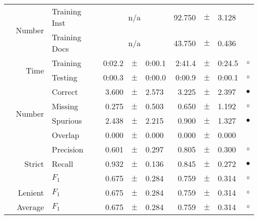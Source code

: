 \begin{longtable}{|r|r|l||rcl|rcl|c|}
\cline{2-10} & \multirow{2}{*}{    Number} &   Training Inst &    \multicolumn{3}{c|}{n/a}         &      92.750 &  $\pm$  &       3.128 &  \\
\cline{3-10} &                             &   Training Docs &    \multicolumn{3}{c|}{n/a}         &      43.750 &  $\pm$  &       0.436 &  \\
\cline{2-10} & \multirow{2}{*}{      Time} &        Training &      0:02.2 &  $\pm$  &      0:00.1 &      2:41.4 &  $\pm$  &      0:24.5 & $\circ$ \\
\cline{3-10} &                             &         Testing &      0:00.3 &  $\pm$  &      0:00.0 &      0:00.9 &  $\pm$  &      0:00.1 & $\circ$ \\
\hline
\pagebreak[4]
\hline
\hline
\multirow{11}{*}{\begin{sideways}amateur unit\end{sideways} }
             & \multirow{4}{*}{    Number} &         Correct &       3.600 &  $\pm$  &       2.573 &       3.225 &  $\pm$  &       2.397 & $\bullet$ \\
\cline{3-10} &                             &         Missing &       0.275 &  $\pm$  &       0.503 &       0.650 &  $\pm$  &       1.192 & $\circ$ \\
\cline{3-10} &                             &        Spurious &       2.438 &  $\pm$  &       2.215 &       0.900 &  $\pm$  &       1.327 & $\bullet$ \\
\cline{3-10} &                             &         Overlap &       0.000 &  $\pm$  &       0.000 &       0.000 &  $\pm$  &       0.000 &  \\
\cline{2-10} & \multirow{3}{*}{    Strict} &       Precision &       0.601 &  $\pm$  &       0.297 &       0.805 &  $\pm$  &       0.300 & $\circ$ \\
\cline{3-10} &                             &          Recall &       0.932 &  $\pm$  &       0.136 &       0.845 &  $\pm$  &       0.272 & $\bullet$ \\
\cline{3-10} &                             &           $F_1$ &       0.675 &  $\pm$  &       0.284 &       0.759 &  $\pm$  &       0.314 & $\circ$ \\
\cline{2-10} &                     Lenient &           $F_1$ &       0.675 &  $\pm$  &       0.284 &       0.759 &  $\pm$  &       0.314 & $\circ$ \\
\cline{2-10} &                     Average &           $F_1$ &       0.675 &  $\pm$  &       0.284 &       0.759 &  $\pm$  &       0.314 & $\circ$ \\

\end{longtable}
